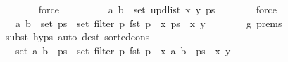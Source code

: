 \begin{isabellebody}
\ \ \ \ \ \ \isamarkupfalse%
\ force\isanewline
\ \ \ \ \isamarkupfalse%
\ \isamarkupfalse%
\ {\isachardoublequoteopen}{\isachardot}{\kern0pt}{\isachardot}{\kern0pt}{\isachardot}{\kern0pt}\ {\isacharequal}{\kern0pt}\ {\isacharbraceleft}{\kern0pt}{\isacharparenleft}{\kern0pt}a{\isacharcomma}{\kern0pt}\ b{\isacharparenright}{\kern0pt}{\isacharbraceright}{\kern0pt}\ {\isasymunion}\ set\ {\isacharparenleft}{\kern0pt}upd{\isacharunderscore}{\kern0pt}list\ x\ y\ ps{\isacharparenright}{\kern0pt}{\isachardoublequoteclose}\isanewline
\ \ \ \ \ \ \isamarkupfalse%
\ force\isanewline
\ \ \ \ \isamarkupfalse%
\ \isamarkupfalse%
\ {\isachardoublequoteopen}{\isachardot}{\kern0pt}{\isachardot}{\kern0pt}{\isachardot}{\kern0pt}\ {\isacharequal}{\kern0pt}\ {\isacharbraceleft}{\kern0pt}{\isacharparenleft}{\kern0pt}a{\isacharcomma}{\kern0pt}\ b{\isacharparenright}{\kern0pt}{\isacharbraceright}{\kern0pt}\ {\isasymunion}\ set\ ps\ {\isacharminus}{\kern0pt}\ set\ {\isacharparenleft}{\kern0pt}filter\ {\isacharparenleft}{\kern0pt}{\isasymlambda}p{\isachardot}{\kern0pt}\ fst\ p\ {\isacharequal}{\kern0pt}\ x{\isacharparenright}{\kern0pt}\ ps{\isacharparenright}{\kern0pt}\ {\isasymunion}\ {\isacharbraceleft}{\kern0pt}{\isacharparenleft}{\kern0pt}x{\isacharcomma}{\kern0pt}\ y{\isacharparenright}{\kern0pt}{\isacharbraceright}{\kern0pt}{\isachardoublequoteclose}\isanewline
\ \ \ \ \ \ \isamarkupfalse%
\ g\ {\isachardoublequoteopen}{}{\isachardot}{\kern0pt}prems{\isachardoublequoteclose}\isanewline
\ \ \ \ \ \ \isamarkupfalse%
\ {\isacharparenleft}{\kern0pt}subst\ {\isachardoublequoteopen}{}{\isachardot}{\kern0pt}hyps{\isachardoublequoteclose}{\isacharparenright}{\kern0pt}\ {\isacharparenleft}{\kern0pt}auto\ dest{\isacharcolon}{\kern0pt}\ sorted{\isacharunderscore}{\kern0pt}cons{\isacharparenright}{\kern0pt}\isanewline
\ \ \ \ \isamarkupfalse%
\ \isamarkupfalse%
\ {\isachardoublequoteopen}{\isachardot}{\kern0pt}{\isachardot}{\kern0pt}{\isachardot}{\kern0pt}\ {\isacharequal}{\kern0pt}\ set\ {\isacharparenleft}{\kern0pt}{\isacharparenleft}{\kern0pt}a{\isacharcomma}{\kern0pt}\ b{\isacharparenright}{\kern0pt}\ {\isacharhash}{\kern0pt}\ ps{\isacharparenright}{\kern0pt}\ {\isacharminus}{\kern0pt}\ set\ {\isacharparenleft}{\kern0pt}filter\ {\isacharparenleft}{\kern0pt}{\isasymlambda}p{\isachardot}{\kern0pt}\ fst\ p\ {\isacharequal}{\kern0pt}\ x{\isacharparenright}{\kern0pt}\ {\isacharparenleft}{\kern0pt}{\isacharparenleft}{\kern0pt}a{\isacharcomma}{\kern0pt}\ b{\isacharparenright}{\kern0pt}\ {\isacharhash}{\kern0pt}\ ps{\isacharparenright}{\kern0pt}{\isacharparenright}{\kern0pt}\ {\isasymunion}\ {\isacharbraceleft}{\kern0pt}{\isacharparenleft}{\kern0pt}x{\isacharcomma}{\kern0pt}\ y{\isacharparenright}{\kern0pt}{\isacharbraceright}{\kern0pt}{\isachardoublequoteclose}\isanewline

\end{isabellebody}
